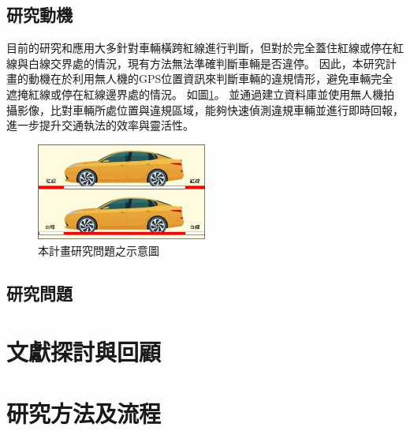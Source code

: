 \documentclass[12pt]{article}       %
\renewcommand{\figurename}{圖}                           %
\begin{document}
\subsection{研究動機} 
\hspace{2em}目前的研究和應用大多針對車輛橫跨紅線進行判斷，但對於完全蓋住紅線或停在紅線與白線交界處的情況，現有方法無法準確判斷車輛是否違停。
因此，本研究計畫的動機在於利用無人機的GPS位置資訊來判斷車輛的違規情形，避免車輛完全遮掩紅線或停在紅線邊界處的情況。
如圖\ref{fig:research_problem}。
並通過建立資料庫並使用無人機拍攝影像，比對車輛所處位置與違規區域，能夠快速偵測違規車輛並進行即時回報，進一步提升交通執法的效率與靈活性。
\begin{figure}[h]
    \centering
    \renewcommand{\figurename}{圖} %
    \includegraphics[width=0.5\textwidth]{research_problem.jpg}     %
    \caption{本計畫研究問題之示意圖}    %
    \label{fig:research_problem}    %
\end{figure}



\subsection{研究問題} 
\hspace{2em}




\section{\centering 文獻探討與回顧}
\hspace{2em}




\section{\centering 研究方法及流程}
\hspace{2em}
\end{document}
